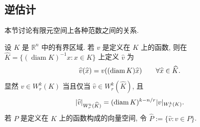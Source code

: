 \subsection{逆估计}
\label{sec:ch04-inverse-estimates}
\setcounter{thmcount}{0}
\setcounter{equation}{0}

本节讨论有限元空间上各种范数之间的关系.

设 $K$ 是 $\mathbb R^n$ 中的有界区域. 若 $v$ 是定义在 $K$ 上的函数, 则在 $\widehat K=\{(\operatorname{diam}K)^{-1}x:x\in K\}$ 上定义 $\widehat v$ 为
\begin{equation}
\MathBookFormulaID{formula-ch04-inverse-scaled-function}
\label{eq:ch04-inverse-scaled-function}
\widehat v(\widehat x)=v((\operatorname{diam}K)\widehat x)
\qquad\forall\widehat x\in\widehat K.
\end{equation}
显然 $v\in W_r^k(K)$ 当且仅当 $\widehat v\in W_r^k(\widehat K)$, 且
\begin{equation}
\MathBookFormulaID{formula-ch04-inverse-scaled-seminorm}
\label{eq:ch04-inverse-scaled-seminorm}
|\widehat v|_{W_r^k(\widehat K)}
=(\operatorname{diam}K)^{k-n/r}|v|_{W_r^k(K)}.
\end{equation}
若 $P$ 是定义在 $K$ 上的函数构成的向量空间, 令 $\widehat P:=\{\widehat v:v\in P\}$.

